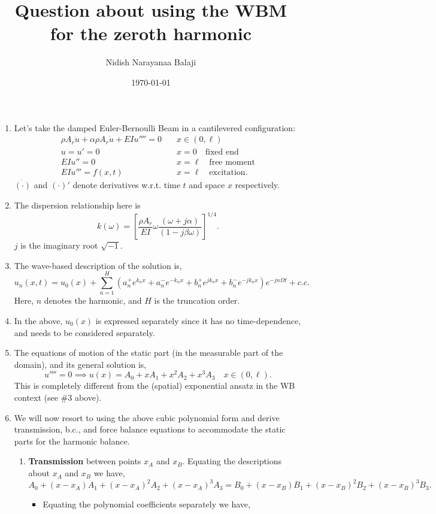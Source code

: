 \documentclass[11pt]{article}
\author{Nidish Narayanaa Balaji}
\date{\today}
\title{Question about using the WBM for the zeroth harmonic}
\begin{document}
\maketitle
\begin{enumerate}
\item Let's take the damped Euler-Bernoulli Beam in a cantilevered configuration:
\begin{align*}
\rho A_r \ddot{u} + \alpha \rho A_r \dot{u} + E I u'''' = 0\quad &x\in(0, \ell)\\
u = u'=0\quad &x=0\quad \text{fixed end}\\
E I u'' = 0\quad & x=\ell\quad \text{free moment}\\
E I u''' = f(x,t)\quad &x=\ell\quad \text{excitation}.
\end{align*}
\(\dot{(\cdot)}\) and \((\cdot)'\) denote derivatives w.r.t. time \(t\) and space \(x\) respectively.
\item The dispersion relationship here is
$$ k(\omega) = {\left[\frac{\rho A_r}{E I} \omega \frac{(\omega+j\alpha)}{(1-j\beta\omega)}\right]}^{1/4}. $$
\(j\) is the imaginary root \(\sqrt{-1}\).
\item The wave-based description of the solution is,
$$ u_n(x,t) = u_0(x) + \sum_{n=1}^H \left(a_n^+ e^{k_nx} + a_n^- e^{-k_nx} + b_n^+ e^{jk_nx} + b_n^- e^{-jk_nx} \right) e^{-j n\Omega t} + c.c. $$
Here, \(n\) denotes the harmonic, and \(H\) is the truncation order.
\item In the above, \(u_0(x)\) is expressed separately since it has no time-dependence, and needs to be considered separately.
\item The equations of motion of the static part (in the measurable part of the domain), and its general solution is,
$$ u'''' = 0 \implies u(x) = A_0 + x A_1 + x^2 A_2 + x^3 A_3 \quad x\in(0,\ell). $$
This is completely different from the (spatial) exponential ansatz in the WB context (see \#3 above).
\item We will now resort to using the above cubic polynomial form and derive transmission, b.c., and force balance equations to accommodate the static parts for the harmonic balance.
\begin{enumerate}
\item \textbf{Transmission} between points \(x_A\) and \(x_B\).
Equating the descriptions about \(x_A\) and \(x_B\) we have,
$$ A_0 + (x-x_A) A_1 + (x-x_A)^2 A_2 + (x-x_A)^3 A_3 = B_0 + (x-x_B) B_1 + (x-x_B)^2 B_2 + (x-x_B)^3 B_3. $$
\begin{itemize}
\item Equating the polynomial coefficients separately we have,

\end{itemize}
\end{enumerate}
\end{enumerate}
\end{document}
